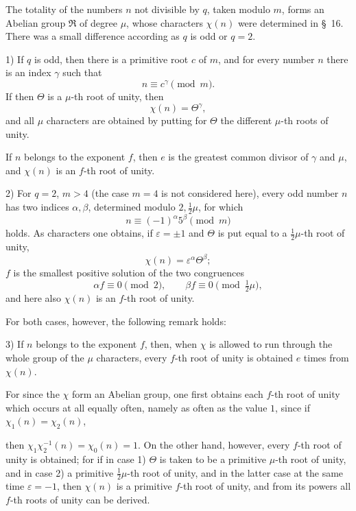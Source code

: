 \documentclass[11pt]{article}
\begin{document}
The totality of the numbers $n$ not divisible by $q$, taken modulo $m$, forms an Abelian group $\mathfrak R$ of degree $\mu$, whose characters $\chi(n)$ were determined in \S~16. There was a small difference according as $q$ is odd or $q=2$.

1) If $q$ is odd, then there is a primitive root $c$ of $m$, and for every number $n$ there is an index $\gamma$ such that
\begin{equation}
n\equiv c^\gamma\pmod m.
\tag{5}
\end{equation}
If then $\Theta$ is a $\mu$-th root of unity, then
\begin{equation}
\chi(n)=\Theta^\gamma,
\tag{6}
\end{equation}
and all $\mu$ characters are obtained by putting for $\Theta$ the different $\mu$-th roots of unity.

If $n$ belongs to the exponent $f$, then $e$ is the greatest common divisor of $\gamma$ and $\mu$, and $\chi(n)$ is an $f$-th root of unity.

2) For $q=2$, $m>4$ (the case $m=4$ is not considered here), every odd number $n$ has two indices $\alpha,\beta$, determined modulo $2,\frac12\mu$, for which
\begin{equation}
n\equiv(-1)^\alpha 5^\beta\pmod m
\tag{7}
\end{equation}
holds. As characters one obtains, if $\varepsilon=\pm1$ and $\Theta$ is put equal to a $\frac12\mu$-th root of unity,
\begin{equation}
\chi(n)=\varepsilon^\alpha\Theta^\beta;
\tag{8}
\end{equation}
$f$ is the smallest positive solution of the two congruences
\[
\alpha f\equiv0\pmod2,\qquad \beta f\equiv0\pmod{\tfrac12\mu},
\]
and here also $\chi(n)$ is an $f$-th root of unity.

For both cases, however, the following remark holds:

3) If $n$ belongs to the exponent $f$, then, when $\chi$ is allowed to run through the whole group of the $\mu$ characters, every $f$-th root of unity is obtained $e$ times from $\chi(n)$.

For since the $\chi$ form an Abelian group, one first obtains each $f$-th root of unity which occurs at all equally often, namely as often as the value $1$, since if $\chi_1(n)=\chi_2(n)$,

then $\chi_1\chi_2^{-1}(n)=\chi_0(n)=1$. On the other hand, however, every $f$-th root of unity is obtained; for if in case 1) $\Theta$ is taken to be a primitive $\mu$-th root of unity, and in case 2) a primitive $\frac12\mu$-th root of unity, and in the latter case at the same time $\varepsilon=-1$, then $\chi(n)$ is a primitive $f$-th root of unity, and from its powers all $f$-th roots of unity can be derived.
\end{document}
